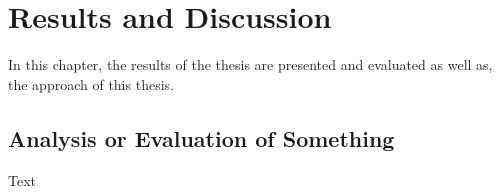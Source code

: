 \documentclass[class=scrbook, crop=false]{standalone}
\begin{document}
\chapter{Results and Discussion} %
\label{Chapter::Results and Discussion}
    In this chapter, the results of the thesis are presented and evaluated as well as, the approach of this thesis.

\section{Analysis or Evaluation of Something}
\label{Section::Analysis or Evaluation of Something}    
    Text
\end{document}
